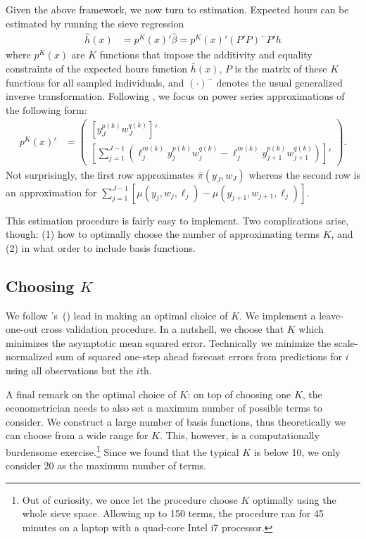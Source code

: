 \documentclass[11pt,letterpaper]{article}                  %
\newcommand\citepos[1]{\citeauthor{#1}'s\ (\citeyear{#1})}
\begin{document}
Given the above framework, we now turn to estimation.
Expected hours can be estimated by running the sieve regression
\begin{align*}
	\hat{h}(x) &= p^K (x)' \hat{\beta} = p^K (x)' (P' P)^- P' h
\end{align*}
where $p^K (x)$ are $K$ functions that impose the additivity and equality constraints of the expected hours function $\bar{h} (x)$, $P$ is the matrix of these $K$ functions for all sampled individuals, and $(\cdot)^-$ denotes the usual generalized inverse transformation.
Following \citet{Blomquist2002}, we focus on power series approximations of the following form:
\begin{align*}
	p^K (x)' &= \begin{pmatrix}
		\left[ y_J^{p(k)} w_J^{q(k)} \right] ' \\
		\left[ \sum_{j=1}^{J-1} \left( \ell_j^{m(k)} y_j^{p(k)} w_j^{q(k)} - \ell_j^{m(k)} y_{j+1}^{p(k)} w_{j+1}^{q(k)} \right) \right]'
	\end{pmatrix}.
\end{align*}
Not surprisingly, the first row approximates $\bar{\pi} (y_J, w_J)$ whereas the second row is an approximation for $\sum_{j=1}^{J-1} [\mu(y_j, w_j, \ell_j) - \mu(y_{j+1}, w_{j+1}, \ell_j)]$.

This estimation procedure is fairly easy to implement.
Two complications arise, though: (1) how to optimally choose the number of approximating terms $K$, and (2) in what order to include basis functions.

\subsection{Choosing $K$}

We follow \citepos{Blomquist2002} lead in making an optimal choice of $K$.
We implement a leave-one-out cross validation procedure.
In a nutshell, we choose that $K$ which minimizes the asymptotic mean squared error.
Technically we minimize the scale-normalized sum of squared one-step ahead forecast errors from predictions for $i$ using all observations but the $i$th.

A final remark on the optimal choice of $K$: on top of choosing one $K$, the econometrician needs to also set a maximum number of possible terms to consider.
We construct a large number of basis functions, thus theoretically we can choose from a wide range for $K$.
This, however, is a computationally burdensome exercise.\footnote{Out of curiosity, we once let the procedure choose $K$ optimally using the whole sieve space. Allowing up to 150 terms, the procedure ran for 45 minutes on a laptop with a quad-core Intel i7 processor.}
Since we found that the typical $K$ is below 10, we only consider 20 as the maximum number of terms.
\end{document}
